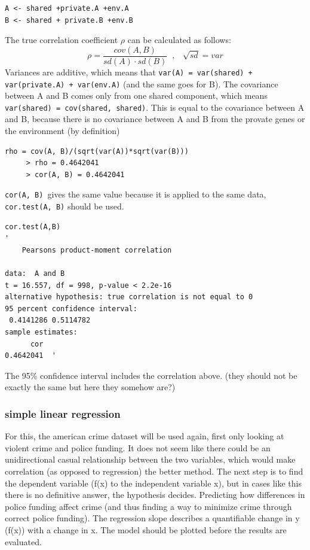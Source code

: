 \documentclass{article}
\begin{document}
\begin{lstlisting}
A <- shared +private.A +env.A
B <- shared + private.B +env.B
\end{lstlisting}
The true correlation coefficient $\rho$ can be calculated as follows: $$\rho = \frac{cov(A, B)}{sd(A) \cdot sd(B)} \;\; , \;\;\; \sqrt{sd} = var$$
Variances are additive, which means that \texttt{var(A) = var(shared) + var(private.A) + var(env.A)} (and the same goes for B). The covariance between A and B comes only from one shared component, which means \texttt{var(shared) = cov(shared, shared)}. This is equal to the covariance between A and B, because there is no covariance between A and B from the provate genes or the environment (by definition)
\begin{lstlisting}
rho = cov(A, B)/(sqrt(var(A))*sqrt(var(B)))
     > rho = 0.4642041
     > cor(A, B) = 0.4642041 
\end{lstlisting}

\texttt{cor(A, B) }gives the same value because it is applied to the same data, \texttt{cor.test(A, B)} should be used.

\begin{lstlisting}
cor.test(A,B)
'
	Pearsons product-moment correlation

data:  A and B
t = 16.557, df = 998, p-value < 2.2e-16
alternative hypothesis: true correlation is not equal to 0
95 percent confidence interval:
 0.4141286 0.5114782
sample estimates:
      cor 
0.4642041  '
\end{lstlisting}

The 95\% confidence interval includes the correlation above. (they should not be exactly the same but here they somehow are?)

\subsubsection{simple linear regression}
For this, the american crime dataset will be used again, first only looking at violent crime and police funding. It does not seem like there could be an unidirectional casual relationship between the two variables, which would make correlation (as opposed to regression) the better method. The next step is to find the dependent variable (f(x) to the independent variable x), but in cases like this there is no definitive answer, the hypothesis decides. Predicting how differences in police funding affect crime (and thus finding a way to minimize crime through correct police funding). The regression slope describes a quantifiable change in y (f(x)) with a change in x. The model should be plotted before the results are evaluated.
\end{document}
